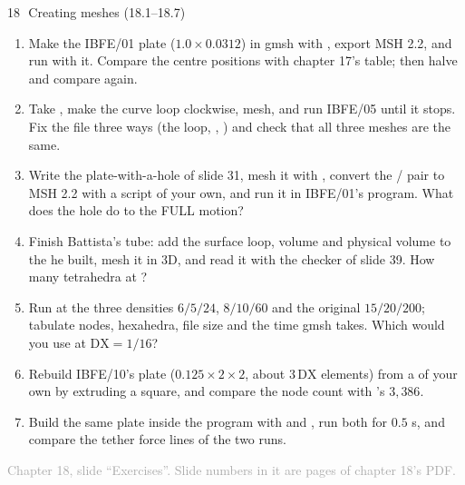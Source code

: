 \documentclass[aspectratio=169,11pt]{beamer}
\newcommand{\sourcecredit}[1]{\vfill\begin{flushright}\tiny\textcolor{DarkGray}{#1}\end{flushright}}
\begin{document}
\begin{frame}{18\,\textbullet\ Creating meshes (18.1--18.7)}
\label{fr:c18x1}
\footnotesize
\begin{enumerate}
  \item[18.1] Make the IBFE/01 plate ($1.0\times0.0312$) in gmsh with , export MSH 2.2, and run  with it. Compare the centre positions with chapter 17's table; then halve  and compare again.
  \item[18.2] Take , make the curve loop clockwise, mesh, and run IBFE/05 until it stops. Fix the file three ways (the loop, , ) and check that all three meshes are the same.
  \item[18.3] Write the plate-with-a-hole  of slide 31, mesh it with , convert the / pair to MSH 2.2 with a script of your own, and run it in IBFE/01's program. What does the hole do to the FULL motion?
  \item[18.4] Finish Battista's tube: add the surface loop, volume and physical volume to the  he built, mesh it in 3D, and read it with the checker of slide 39. How many tetrahedra at ?
  \item[18.5] Run  at the three densities $6/5/24$, $8/10/60$ and the original $15/20/200$; tabulate nodes, hexahedra, file size and the time gmsh takes. Which would you use at $\mathrm{DX} = 1/16$?
  \item[18.6] Rebuild IBFE/10's plate ($0.125\times2\times2$, about $3\,\mathrm{DX}$ elements) from a  of your own by extruding a square, and compare the node count with 's $3{,}386$.
  \item[18.7] Build the same plate inside the program with  and , run both for $0.5$ s, and compare the tether force lines of the two runs.
\end{enumerate}
\sourcecredit{Chapter 18, slide ``Exercises''. Slide numbers in it are pages of chapter 18's PDF.}
\end{frame}
\end{document}
